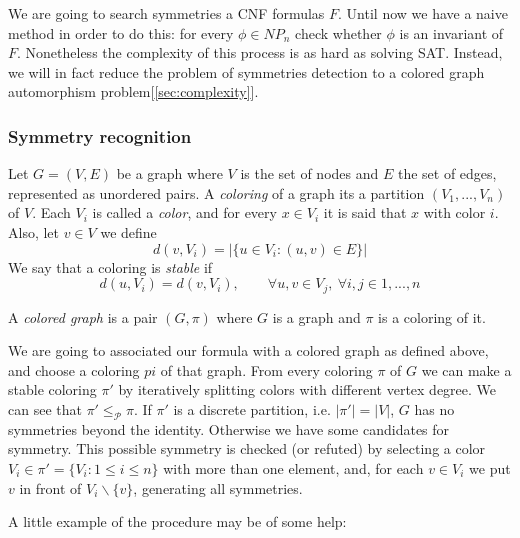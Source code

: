 {We are going to search symmetries a CNF formulas $F$. Until now we have a naive method in order to do this: for every $\phi \in NP_n$ check whether $\phi$ is an invariant of $F$. Nonetheless the complexity of this process is as hard as solving SAT. Instead, we will in fact reduce the problem of symmetries detection to a colored graph  automorphism problem[\ref{sec:complexity}].\\




\subsubsection{Symmetry recognition}



\begin{definition}
  Let $G = (V,E)$ be a graph where $V$ is the set of nodes and $E$ the set of edges, represented as unordered pairs. A \emph{coloring} of a graph its a partition  $(V_1,...,V_n)$ of $V$. Each  $V_i$ is called a \emph{color}, and for every $x\in V_i$ it is said that $x$ with color $i$. Also, let $v\in V$ we define $$d(v, V_i) = |\{u \in V_i : (u,v)\in E\}|$$
  We say that a coloring is \emph{stable} if
  $$d(u,V_i) = d(v,V_i), \qquad  \forall u,v \in V_j,\ \forall i,j \in 1,...,n$$

  A \emph{colored graph} is a pair $(G,\pi)$ where $G$ is a graph and $\pi$ is a coloring of it.
\end{definition}


We are going to associated our formula with a colored graph as defined above, and choose a coloring $pi$ of that graph. From every coloring $\pi$ of $G$ we can make a stable coloring $\pi'$ by iteratively splitting colors with different vertex degree. We can see that $\pi' \le_\mathcal{P} \pi$. If $\pi'$ is a discrete partition, i.e. $|\pi'| = |V|$,  $G$ has no symmetries beyond the identity. Otherwise we have some candidates for symmetry. This possible symmetry is checked (or refuted) by selecting a color $V_i\in \pi' = \{V_i : 1 \le i \le n\}$ with more than one element, and, for each $v\in V_i$ we put $v$ in front of $V_i \backslash \{v\}$, generating all symmetries.

\begin{example}

A little example of the procedure may be of some help:
\begin{figure}[H]
  \centering
  
\end{figure}
\end{example}}
